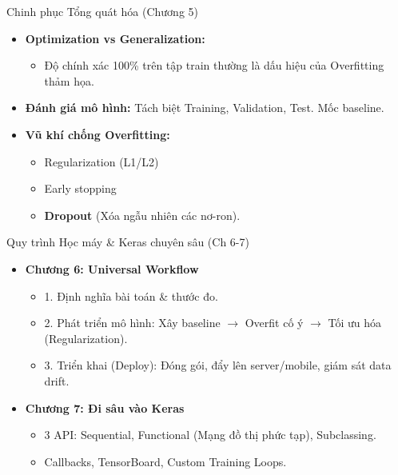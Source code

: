 \documentclass[aspectratio=169]{beamer}
\begin{document}
\begin{frame}{Chinh phục Tổng quát hóa (Chương 5)}
    \begin{itemize}
        \item \textbf{Optimization vs Generalization:}
        \begin{itemize}
            \item Độ chính xác 100\% trên tập train thường là dấu hiệu của Overfitting thảm họa.
        \end{itemize}
        \item \textbf{Đánh giá mô hình:} Tách biệt Training, Validation, Test. Mốc baseline.
        \item \textbf{Vũ khí chống Overfitting:}
        \begin{itemize}
            \item Regularization (L1/L2)
            \item Early stopping
            \item \textbf{Dropout} (Xóa ngẫu nhiên các nơ-ron).
        \end{itemize}
    \end{itemize}
\end{frame}

\begin{frame}{Quy trình Học máy \& Keras chuyên sâu (Ch 6-7)}
    \begin{itemize}
        \item \textbf{Chương 6: Universal Workflow}
        \begin{itemize}
            \item 1. Định nghĩa bài toán \& thước đo.
            \item 2. Phát triển mô hình: Xây baseline $\rightarrow$ Overfit cố ý $\rightarrow$ Tối ưu hóa (Regularization).
            \item 3. Triển khai (Deploy): Đóng gói, đẩy lên server/mobile, giám sát data drift.
        \end{itemize}
        \item \textbf{Chương 7: Đi sâu vào Keras}
        \begin{itemize}
            \item 3 API: Sequential, Functional (Mạng đồ thị phức tạp), Subclassing.
            \item Callbacks, TensorBoard, Custom Training Loops.
        \end{itemize}
    \end{itemize}
\end{frame}
\end{document}
